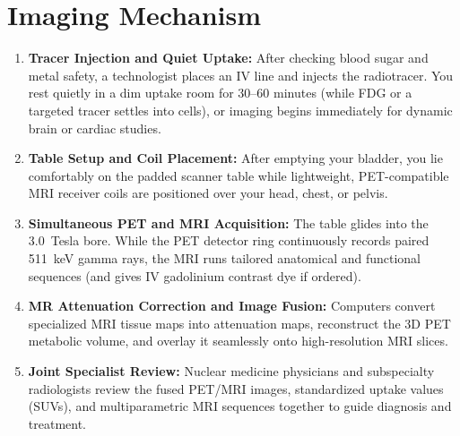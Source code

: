 \section{Imaging Mechanism}
\begin{enumerate}
\item \textbf{Tracer Injection and Quiet Uptake:} After checking blood sugar and metal safety, a technologist places an IV line and injects the radiotracer. You rest quietly in a dim uptake room for 30--60 minutes (while FDG or a targeted tracer settles into cells), or imaging begins immediately for dynamic brain or cardiac studies.
\item \textbf{Table Setup and Coil Placement:} After emptying your bladder, you lie comfortably on the padded scanner table while lightweight, PET-compatible MRI receiver coils are positioned over your head, chest, or pelvis.
\item \textbf{Simultaneous PET and MRI Acquisition:} The table glides into the 3.0~Tesla bore. While the PET detector ring continuously records paired 511~keV gamma rays, the MRI runs tailored anatomical and functional sequences (and gives IV gadolinium contrast dye if ordered).
\item \textbf{MR Attenuation Correction and Image Fusion:} Computers convert specialized MRI tissue maps into attenuation maps, reconstruct the 3D PET metabolic volume, and overlay it seamlessly onto high-resolution MRI slices.
\item \textbf{Joint Specialist Review:} Nuclear medicine physicians and subspecialty radiologists review the fused PET/MRI images, standardized uptake values (SUVs), and multiparametric MRI sequences together to guide diagnosis and treatment.
\end{enumerate}

